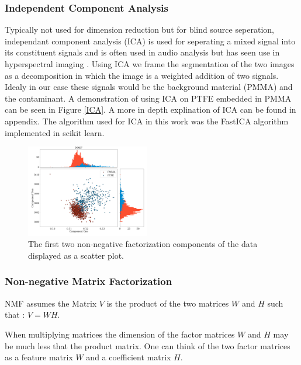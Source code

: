 \documentclass[a4paper,11pt]{article}
\begin{document}
\subsubsection{Independent Component Analysis}

Typically not used for dimension reduction but for blind source seperation, independant component analysis (ICA) is used for seperating a mixed signal into its constituent signals and is often used in audio analysis but has seen use in hyperspectral imaging \cite{Villa}. Using ICA we frame the segmentation of the two images as a decomposition in which the image is a weighted addition of two signals. Idealy in our case these signals would be the background material (PMMA) and the contaminant. A demonstration of using ICA on PTFE embedded in PMMA can be seen in Figure \ref{ICA}. A more in depth explination of ICA can be found in appendix. The algorithm used for ICA in this work was the FastICA \cite{Hyv} algorithm implemented in scikit learn.

\begin{figure}
  
  \begin{center}
    \includegraphics[width=0.48\textwidth]{figures/NMFnone.png}
  \end{center}
  
  \caption{The first two non-negative factorization components of the data displayed as a scatter plot.}
  
  \label{NMF}
\end{figure}

\subsubsection{Non-negative Matrix Factorization}

NMF assumes the Matrix $V$ is the product of the two matrices $W$ and $H$ such that : $V = WH$. 

When multiplying matrices the dimension of the factor matrices $W$ and $H$ may be much less that the product matrix. One can think of the two factor matrices as a feature matrix $W$ and a coefficient matrix $H$.
\end{document}
